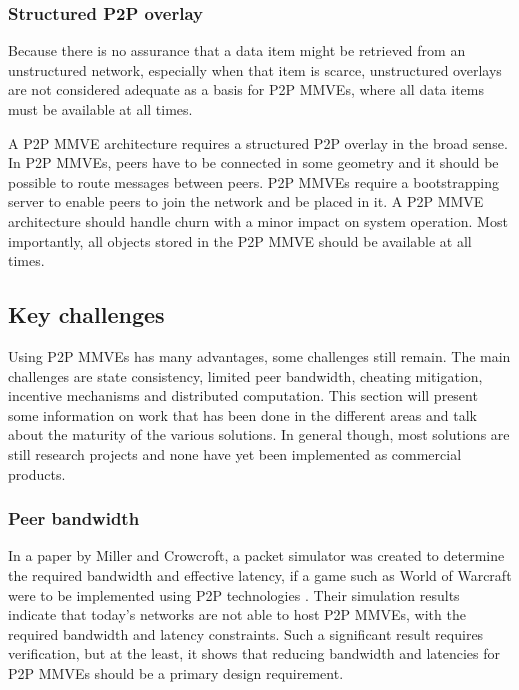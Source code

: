 \subsubsection{Structured P2P overlay}

Because there is no assurance that a data item might be retrieved from an unstructured network, especially when that item is scarce, unstructured overlays are not considered adequate as a basis for P2P MMVEs, where all data items must be available at all times.

A P2P MMVE architecture requires a structured P2P overlay in the broad sense. In P2P MMVEs, peers have to be connected in some geometry and it should be possible to route messages between peers. P2P MMVEs require a bootstrapping server to enable peers to join the network and be placed in it. A P2P MMVE architecture should handle churn with a minor impact on system operation. Most importantly, all objects stored in the P2P MMVE should be available at all times.

\subsection{Key challenges}
\label{key_challenges}

Using P2P MMVEs has many advantages, some challenges still remain. The main challenges are state consistency, limited peer bandwidth, cheating mitigation, incentive mechanisms and distributed computation. This section will present some information on work that has been done in the different areas and talk about the maturity of the various solutions. In general though, most solutions are still research projects and none have yet been implemented as commercial products.

\subsubsection{Peer bandwidth}

In a paper by Miller and Crowcroft, a packet simulator was created to determine the required bandwidth and effective latency, if a game such as World of Warcraft were to be implemented using P2P technologies \cite{Miller_p2p_infeasability}. Their simulation results indicate that today's networks are not able to host P2P MMVEs, with the required bandwidth and latency constraints. Such a significant result requires verification, but at the least, it shows that reducing bandwidth and latencies for P2P MMVEs should be a primary design requirement.

